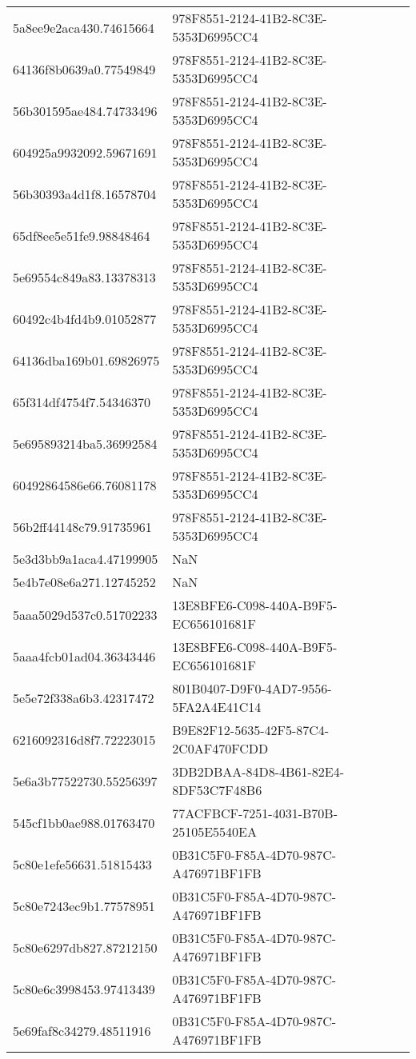 \begin{tabular}{ll}
5a8ee9e2aca430.74615664 & 978F8551-2124-41B2-8C3E-5353D6995CC4 \\
64136f8b0639a0.77549849 & 978F8551-2124-41B2-8C3E-5353D6995CC4 \\
56b301595ae484.74733496 & 978F8551-2124-41B2-8C3E-5353D6995CC4 \\
604925a9932092.59671691 & 978F8551-2124-41B2-8C3E-5353D6995CC4 \\
56b30393a4d1f8.16578704 & 978F8551-2124-41B2-8C3E-5353D6995CC4 \\
65df8ee5e51fe9.98848464 & 978F8551-2124-41B2-8C3E-5353D6995CC4 \\
5e69554c849a83.13378313 & 978F8551-2124-41B2-8C3E-5353D6995CC4 \\
60492c4b4fd4b9.01052877 & 978F8551-2124-41B2-8C3E-5353D6995CC4 \\
64136dba169b01.69826975 & 978F8551-2124-41B2-8C3E-5353D6995CC4 \\
65f314df4754f7.54346370 & 978F8551-2124-41B2-8C3E-5353D6995CC4 \\
5e695893214ba5.36992584 & 978F8551-2124-41B2-8C3E-5353D6995CC4 \\
60492864586e66.76081178 & 978F8551-2124-41B2-8C3E-5353D6995CC4 \\
56b2ff44148c79.91735961 & 978F8551-2124-41B2-8C3E-5353D6995CC4 \\
5e3d3bb9a1aca4.47199905 & NaN \\
5e4b7e08e6a271.12745252 & NaN \\
5aaa5029d537c0.51702233 & 13E8BFE6-C098-440A-B9F5-EC656101681F \\
5aaa4fcb01ad04.36343446 & 13E8BFE6-C098-440A-B9F5-EC656101681F \\
5e5e72f338a6b3.42317472 & 801B0407-D9F0-4AD7-9556-5FA2A4E41C14 \\
6216092316d8f7.72223015 & B9E82F12-5635-42F5-87C4-2C0AF470FCDD \\
5e6a3b77522730.55256397 & 3DB2DBAA-84D8-4B61-82E4-8DF53C7F48B6 \\
545cf1bb0ae988.01763470 & 77ACFBCF-7251-4031-B70B-25105E5540EA \\
5c80e1efe56631.51815433 & 0B31C5F0-F85A-4D70-987C-A476971BF1FB \\
5c80e7243ec9b1.77578951 & 0B31C5F0-F85A-4D70-987C-A476971BF1FB \\
5c80e6297db827.87212150 & 0B31C5F0-F85A-4D70-987C-A476971BF1FB \\
5c80e6c3998453.97413439 & 0B31C5F0-F85A-4D70-987C-A476971BF1FB \\
5e69faf8c34279.48511916 & 0B31C5F0-F85A-4D70-987C-A476971BF1FB \\

\end{tabular}
